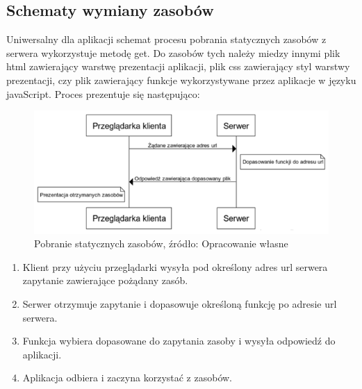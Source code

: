 \documentclass[12pt]{report}
\begin{document}
\subsection{Schematy wymiany zasobów}
Uniwersalny dla aplikacji schemat procesu pobrania statycznych zasobów z serwera wykorzystuje metodę get. Do zasobów tych należy miedzy innymi plik html zawierający warstwę prezentacji aplikacji, plik css zawierający styl warstwy prezentacji, czy plik zawierający funkcje wykorzystywane przez aplikacje w języku javaScript. Proces prezentuje się następująco:
\begin{figure}[!hb]
\centering
\includegraphics[width=\textwidth,height=\textheight,keepaspectratio]{K-S.png} 
\caption{Pobranie statycznych zasobów, źródło: Opracowanie własne}
\end{figure}
\begin{enumerate}
\item Klient przy użyciu przeglądarki wysyła pod określony adres url serwera zapytanie zawierające pożądany zasób.
\item Serwer otrzymuje zapytanie i dopasowuje określoną funkcję po adresie url serwera.
\item Funkcja wybiera dopasowane do zapytania zasoby i wysyła odpowiedź do aplikacji.
\item Aplikacja odbiera i zaczyna korzystać z zasobów.
\end{enumerate}
\end{document}
